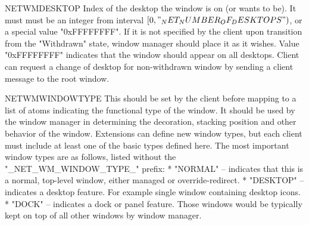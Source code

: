 \heading \uns NET\uns WM\uns DESKTOP
Index of the desktop the window is on (or wants to be).
It must must be an integer from interval $[0,"_NET_NUMBER_OF_DESKTOPS")$, or a special value "0xFFFFFFFF".
If it is not specified by the client upon transition from the "Withdrawn" state, window manager should place it as it wishes.
Value "0xFFFFFFFF" indicates that the window should appear on all desktops.
Client can request a change of desktop for non-withdrawn window by sending a client message to the root window.

\heading \uns NET\uns WM\uns WINDOW\uns TYPE
This should be set by the client before mapping to a list of atoms indicating the functional type of the window.
It should be used by the window manager in determining the decoration, stacking position and other behavior of the window.
Extensions can define new window types, but each client must include at least one of the basic types defined here.
The most important window types are as follows, listed without the "_NET_WM_WINDOW_TYPE_" prefix:
\begitems
* "NORMAL" --  indicates that this is a normal, top-level window, either managed or override-redirect.
* "DESKTOP" -- indicates a desktop feature.
For example single window containing desktop icons.
* "DOCK" -- indicates a dock or panel feature.
Those windows would be typically kept on top of all other windows by window manager.
\enditems


